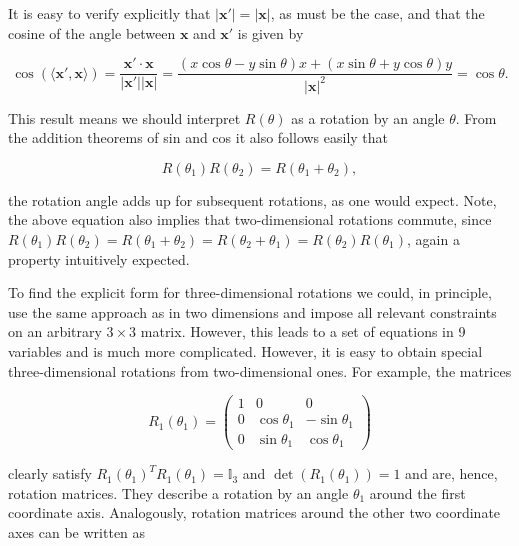\documentclass[a4paper,12pt]{report}
\begin{document}
It is easy to verify explicitly that \(|\mathbf{x}'| = |\mathbf{x}|\), as must be the case, and that the cosine of the angle between \(\mathbf{x}\) and \(\mathbf{x}'\) is given by

\begin{equation}
\cos(\langle \mathbf{x}', \mathbf{x} \rangle) = \frac{\mathbf{x}' \cdot \mathbf{x}}{|\mathbf{x}'||\mathbf{x}|} = \frac{(x \cos \theta - y \sin \theta)x + (x \sin \theta + y \cos \theta)y}{|\mathbf{x}|^2} = \cos \theta.
\end{equation}

This result means we should interpret \(R(\theta)\) as a rotation by an angle \(\theta\). From the addition theorems of sin and cos it also follows easily that

\begin{equation}
R(\theta_1)R(\theta_2) = R(\theta_1 + \theta_2),
\end{equation}

\ie the rotation angle adds up for subsequent rotations, as one would expect. Note, the above equation also implies that two-dimensional rotations commute, since \(R(\theta_1)R(\theta_2) = R(\theta_1 + \theta_2) = R(\theta_2 + \theta_1) = R(\theta_2)R(\theta_1)\), again a property intuitively expected.

To find the explicit form for three-dimensional rotations we could, in principle, use the same approach as in two dimensions and impose all relevant constraints on an arbitrary \( 3 \times 3 \) matrix. However, this leads to a set of equations in 9 variables and is much more complicated. However, it is easy to obtain special three-dimensional rotations from two-dimensional ones. For example, the matrices

\begin{equation}
R_1(\theta_1) = 
\begin{pmatrix}
1 & 0 & 0 \\
0 & \cos \theta_1 & -\sin \theta_1 \\
0 & \sin \theta_1 & \cos \theta_1
\end{pmatrix}
\end{equation}

clearly satisfy \( R_1(\theta_1)^T R_1(\theta_1) = \mathbb{I}_3 \) and \( \det(R_1(\theta_1)) = 1 \) and are, hence, rotation matrices. They describe a rotation by an angle \( \theta_1 \) around the first coordinate axis. Analogously, rotation matrices around the other two coordinate axes can be written as
\end{document}

